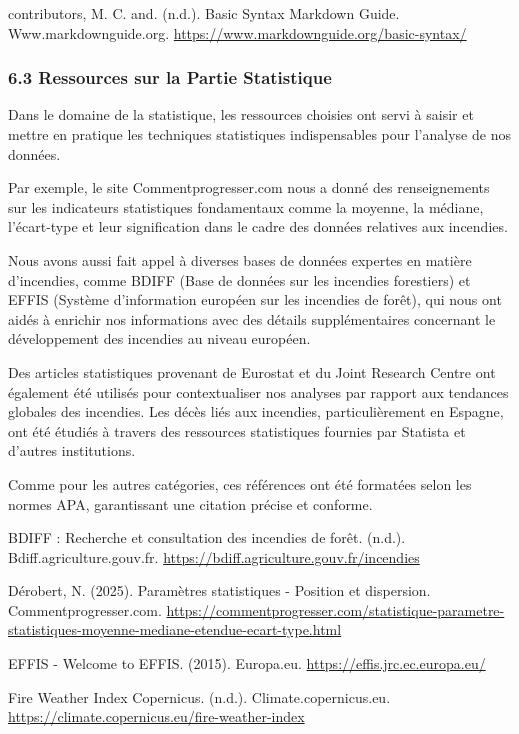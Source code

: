 \documentclass[
]{article}
\begin{document}
contributors, M. C. and. (n.d.). Basic Syntax \textbar{} Markdown Guide.
Www.markdownguide.org. \url{https://www.markdownguide.org/basic-syntax/}

\subsubsection{6.3 Ressources sur la Partie
Statistique}\label{ressources-sur-la-partie-statistique}

Dans le domaine de la statistique, les ressources choisies ont servi à
saisir et mettre en pratique les techniques statistiques indispensables
pour l'analyse de nos données.

Par exemple, le site Commentprogresser.com nous a donné des
renseignements sur les indicateurs statistiques fondamentaux comme la
moyenne, la médiane, l'écart-type et leur signification dans le cadre
des données relatives aux incendies.

Nous avons aussi fait appel à diverses bases de données expertes en
matière d'incendies, comme BDIFF (Base de données sur les incendies
forestiers) et EFFIS (Système d'information européen sur les incendies
de forêt), qui nous ont aidés à enrichir nos informations avec des
détails supplémentaires concernant le développement des incendies au
niveau européen.

Des articles statistiques provenant de Eurostat et du Joint Research
Centre ont également été utilisés pour contextualiser nos analyses par
rapport aux tendances globales des incendies. Les décès liés aux
incendies, particulièrement en Espagne, ont été étudiés à travers des
ressources statistiques fournies par Statista et d'autres institutions.

Comme pour les autres catégories, ces références ont été formatées selon
les normes APA, garantissant une citation précise et conforme.

BDIFF : Recherche et consultation des incendies de forêt. (n.d.).
Bdiff.agriculture.gouv.fr.
\url{https://bdiff.agriculture.gouv.fr/incendies}

Dérobert, N. (2025). Paramètres statistiques - Position et dispersion.
Commentprogresser.com.
\url{https://commentprogresser.com/statistique-parametre-statistiques-moyenne-mediane-etendue-ecart-type.html}

EFFIS - Welcome to EFFIS. (2015). Europa.eu.
\url{https://effis.jrc.ec.europa.eu/}

Fire Weather Index \textbar{} Copernicus. (n.d.). Climate.copernicus.eu.
\url{https://climate.copernicus.eu/fire-weather-index}
\end{document}
